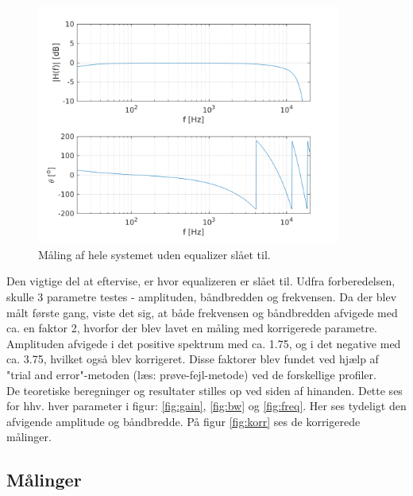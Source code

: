 \begin{figure}[h!]
	\centering
	\includegraphics[width=10cm]{matlabdemo/test/test_eq_off.png}  
	\caption{Måling af hele systemet uden equalizer slået til.}
	\label{fig:eq_off1}
\end{figure}

Den vigtige del at eftervise, er hvor equalizeren er slået til. 
Udfra forberedelsen, skulle 3 parametre testes - amplituden, båndbredden og frekvensen. 
Da der blev målt første gang, viste det sig, at både frekvensen og båndbredden afvigede med ca. en faktor 2, hvorfor der blev lavet en måling med korrigerede parametre. Amplituden afvigede i det positive spektrum med ca. 1.75, og i det negative med ca. 3.75, hvilket også blev korrigeret. Disse faktorer blev fundet ved hjælp af "trial and error"-metoden (læs: prøve-fejl-metode) ved de forskellige profiler. \\
De teoretiske beregninger og resultater stilles op ved siden af hinanden.
Dette ses for hhv. hver parameter i figur: \ref{fig:gain}, \ref{fig:bw} og \ref{fig:freq}. 
Her ses tydeligt den afvigende amplitude og båndbredde. På figur \ref{fig:korr} ses de korrigerede målinger. 

\subsection{Målinger}

